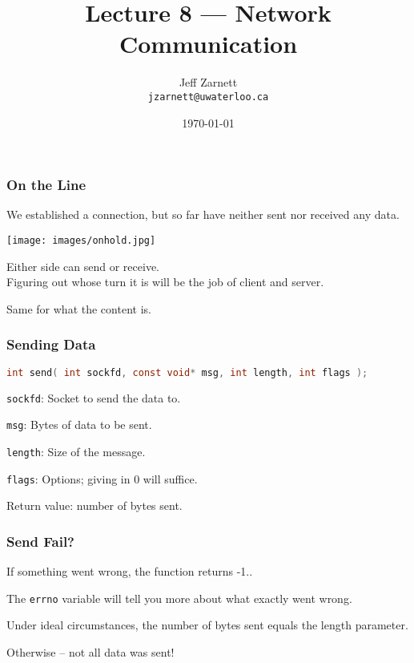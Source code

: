 

\title{Lecture 8 --- Network Communication }

\author{Jeff Zarnett \\ \small \texttt{jzarnett@uwaterloo.ca}}
\date{\today}




\begin{frame}
	\titlepage

\end{frame}



\begin{frame}
	\frametitle{On the Line}

	We established a connection, but so far have neither sent nor received any data.

	\begin{center}
		\texttt{[image: images/onhold.jpg]}
	\end{center}

	Either side can send or receive.\\
	\quad Figuring out whose turn it is will be the job of client and server.

	Same for what the content is.

\end{frame}



\begin{frame}[fragile]
	\frametitle{Sending Data}

	\begin{lstlisting}[language=C]
int send( int sockfd, const void* msg, int length, int flags );
\end{lstlisting}

	\texttt{sockfd}: Socket to send the data to.

	\texttt{msg}: Bytes of data to be sent.

	\texttt{length}: Size of the message.

	\texttt{flags}: Options; giving in 0 will suffice.

	Return value: number of bytes sent.

\end{frame}



\begin{frame}
	\frametitle{Send Fail?}

	If something went wrong, the function returns -1..

	The \texttt{errno} variable will tell you more about what exactly went wrong.

	Under ideal circumstances, the number of bytes sent equals the length parameter.

	Otherwise -- not all data was sent!

\end{frame}



